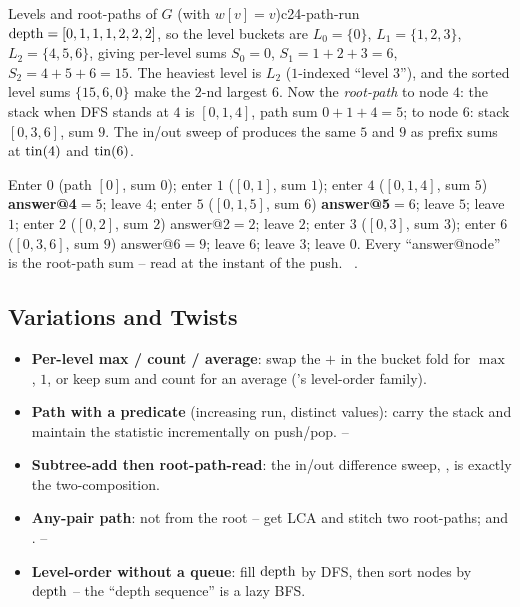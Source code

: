 \begin{example}{Levels and root-paths of $G$ (with $w[v]=v$)}{c24-path-run}
$\operatorname{depth}=[0,1,1,1,2,2,2]$, so the level buckets are
$L_0=\{0\}$, $L_1=\{1,2,3\}$, $L_2=\{4,5,6\}$, giving per-level sums
$S_0=0$, $S_1=1{+}2{+}3=6$, $S_2=4{+}5{+}6=15$. The heaviest level is $L_2$
($1$-indexed ``level $3$''), and the sorted level sums $\{15,6,0\}$ make the $2$-nd largest
$6$. Now the \emph{root-path} to node $4$: the stack when DFS stands at $4$ is
$[0,1,4]$, path sum $0{+}1{+}4=5$; to node $6$: stack $[0,3,6]$, sum $9$. The in/out sweep of
 produces the same $5$ and $9$ as prefix sums at $\operatorname{tin}(4)$ and $\operatorname{tin}(6)$.
\end{example}
\begin{tracebox}
Enter $0$ (path $[0]$, sum $0$); enter $1$ ($[0,1]$, sum $1$); enter $4$ ($[0,1,4]$, sum $5$)
\textbf{answer@4}$=5$; leave $4$; enter $5$ ($[0,1,5]$, sum $6$) \textbf{answer@5}$=6$; leave
$5$; leave $1$; enter $2$ ($[0,2]$, sum $2$) answer@2$=2$; leave $2$; enter $3$ ($[0,3]$,
sum $3$); enter $6$ ($[0,3,6]$, sum $9$) answer@6$=9$; leave $6$; leave $3$; leave $0$. Every
``answer@node'' is the root-path sum -- read at the instant of the push. \checkmark\
.
\end{tracebox}

\subsection{Variations and Twists}

\begin{itemize}[nosep]
  \item \textbf{Per-level max / count / average}: swap the $+$ in the bucket fold for
        $\max$, $1$, or keep sum and count for an average (\chref{c03}'s level-order family). \hfill{}
  \item \textbf{Path with a predicate} (increasing run, distinct values): carry the
        \code{pathVals} stack and maintain the statistic incrementally on push/pop. \hfill{}--
  \item \textbf{Subtree-add then root-path-read}: the in/out difference sweep,
        \propref{c24-sweep}, is exactly the two-composition. \hfill{}
  \item \textbf{Any-pair path}: not from the root -- get LCA and stitch two root-paths;
        \secref{c24-dist} and \chref{c11}.                                   \hfill\lv{4}--
  \item \textbf{Level-order without a queue}: fill $\operatorname{depth}$ by DFS, then sort nodes by
        $\operatorname{depth}$ -- the ``depth sequence'' is a lazy BFS.                     \hfill{}
\end{itemize}

